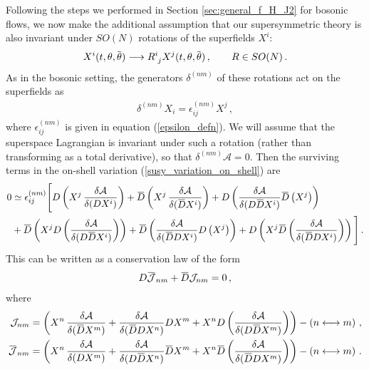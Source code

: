\documentclass[12pt]{article}
\numberwithin{equation}{section}
\newcommand{\overbar}[1]{\mkern 1.5mu\overline{\mkern-1.5mu#1\mkern-1.5mu}\mkern 1.5mu}
\newcommand{\Dbar}{\overbar{D}}
\newcommand{\thetab}{\overbar{\theta}}
\begin{document}
Following the steps we performed in Section \ref{sec:general_f_H_J2} for bosonic flows, we now make the additional assumption that our supersymmetric theory is also invariant under $SO(N)$ rotations of the superfields $X^i$:
%
\begin{align}
    X^i ( t , \theta , \thetab ) \longrightarrow \tensor{R}{^i_j} X^j ( t, \theta, \thetab ) \, , \qquad R \in SO ( N ) \, .
\end{align}
%
As in the bosonic setting, the generators $\delta^{(nm)}$ of these rotations act on the superfields as
%
\begin{align}
    \delta^{(nm)} X_i = \epsilon_{ij}^{(nm)} X^j \, , 
\end{align}
%
where $\epsilon_{ij}^{(nm)}$ is given in equation (\ref{epsilon_defn}). We will assume that the superspace Lagrangian is invariant under such a rotation (rather than transforming as a total derivative), so that $\delta^{(nm)} \mathcal{A} = 0$. Then the surviving terms in the on-shell variation (\ref{susy_variation_on_shell}) are
%
%
\begin{align}
    0 &\simeq \epsilon_{ij}^{(nm)} \Bigg[ D \left( X^j \, \frac{\delta \mathcal{A}}{\delta ( D X^i ) } \right) + \Dbar \left( X^j  \, \frac{\delta \mathcal{A}}{\delta ( \Dbar X^i ) } \right) + D \left( \frac{\delta \mathcal{A}}{\delta (D \Dbar X^i)} \Dbar \left( X^j \right) \right)  \nonumber \\
    &+ \Dbar \left( X^j D \left( \frac{\delta \mathcal{A}}{\delta (D \Dbar X^i)} \right) \right) + \Dbar \left( \frac{\delta \mathcal{A}}{\delta  (\Dbar D  X^i)} D \left( X^j \right) \right) + D \left(  X^j \Dbar \left( \frac{\delta \mathcal{A}}{\delta (\Dbar D X^i)} \right) \right) \Bigg] \, .
\end{align}
%
This can be written as a conservation law of the form
%
\begin{align}
    D \overbar{\mathcal{J}}_{nm} + \Dbar \mathcal{J}_{nm} = 0 \, , 
\end{align}
%
where
%
\begin{align}
    \mathcal{J}_{nm} &= \left(  X^n  \, \frac{\delta \mathcal{A}}{\delta ( \Dbar X^m ) } +  \frac{\delta \mathcal{A}}{\delta  (\Dbar D  X^n)} D X^m  + X^n D \left( \frac{\delta \mathcal{A}}{\delta (D \Dbar X^m)} \right)  \right) - \left( n \longleftrightarrow m \right)  \, , \nonumber \\
    \overbar{\mathcal{J}}_{nm} &= \left( X^n \, \frac{\delta \mathcal{A}}{\delta ( D X^m ) } + \frac{\delta \mathcal{A}}{\delta (D \Dbar X^n)} \Dbar  X^m  +  X^n \Dbar \left( \frac{\delta \mathcal{A}}{\delta (\Dbar D X^m)} \right) \right) - \left( n \longleftrightarrow m \right)  \, .
\end{align}
\end{document}
